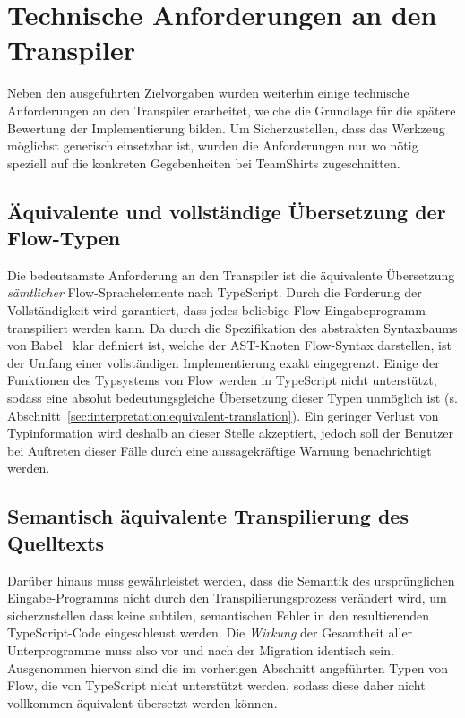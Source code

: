 \section{Technische Anforderungen an den Transpiler}
\label{sec:requirements}

Neben den ausgeführten Zielvorgaben wurden weiterhin einige technische Anforderungen an den Transpiler erarbeitet, welche die Grundlage für die spätere Bewertung der Implementierung bilden. Um Sicherzustellen, dass das Werkzeug möglichst generisch einsetzbar ist, wurden die Anforderungen nur wo nötig speziell auf die konkreten Gegebenheiten bei TeamShirts zugeschnitten.

\subsection{Äquivalente und vollständige Übersetzung der Flow-Typen}
\label{sec:requirement:completeness}

Die bedeutsamste Anforderung an den Transpiler ist die äquivalente Übersetzung \emph{sämtlicher} Flow-Sprachelemente nach TypeScript. Durch die Forderung der Vollständigkeit wird garantiert, dass jedes beliebige Flow-Eingabeprogramm transpiliert werden kann. Da durch die Spezifikation des abstrakten Syntaxbaums von Babel~\autocite{BABEL:PARSER_SPEC} klar definiert ist, welche der AST-Knoten Flow-Syntax darstellen, ist der Umfang einer vollständigen Implementierung exakt eingegrenzt.
Einige der Funktionen des Typsystems von Flow werden in TypeScript nicht unterstützt, sodass eine absolut bedeutungsgleiche Übersetzung dieser Typen unmöglich ist (s. Abschnitt~\ref{sec:interpretation:equivalent-translation}). Ein geringer Verlust von Typinformation wird deshalb an dieser Stelle akzeptiert, jedoch soll der Benutzer bei Auftreten dieser Fälle durch eine aussagekräftige Warnung benachrichtigt werden.

\subsection{Semantisch äquivalente Transpilierung des Quelltexts}
\label{sec:requirement:semantic-equivalence}

Darüber hinaus muss gewährleistet werden, dass die Semantik des ursprünglichen Eingabe-Programms nicht durch den Transpilierungsprozess verändert wird, um sicherzustellen dass keine subtilen, semantischen Fehler in den resultierenden TypeScript-Code eingeschleust werden. Die \emph{Wirkung} der Gesamtheit aller Unterprogramme muss also vor und nach der Migration identisch sein. Ausgenommen hiervon sind die im vorherigen Abschnitt angeführten Typen von Flow, die von TypeScript nicht unterstützt werden, sodass diese daher nicht vollkommen äquivalent übersetzt werden können.

